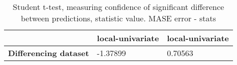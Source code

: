 \begin{table}[H]
\centering
\caption{Student t-test, measuring confidence of significant difference between predictions, statistic value. MASE error - stats}
\label{table:ttest-stats-differencing-experiments-MASE}
\begin{tabular}{lll}
\toprule
{} & local-univariate & local-univariate \\
\midrule
\textbf{Differencing dataset} &         -1.37899 &          0.70563 \\
\bottomrule
\end{tabular}
\end{table}

